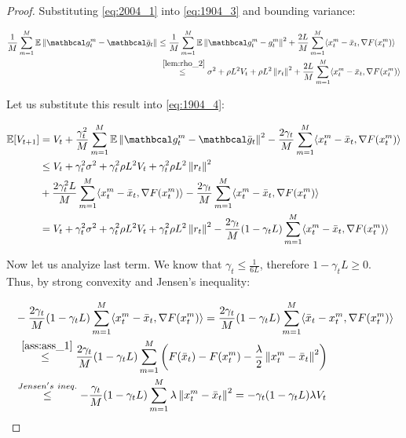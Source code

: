 \begin{proof}
    Substituting \eqref{eq:2004_1} into \eqref{eq:1904_3} and bounding variance:

    \begin{align}
        \fsumm{m=1}{M} \E \norm{\mc{g}^m_t - \mc{\bar{g}}_t} 
        &\leq
        \fsumm{m=1}{M} \E \norm{\mc{g}^m_t - g^m_t}^2 
        +
        \frac{2L}{M} \summ{m=1}{M} \inner{x^m_t - \bar{x}_t}{\nabla F(x^m_t)} \\
        &\overset{~\ref{lem:rho_2}}{\leq}
        \sigma^2 + \rho L^2 V_t + \rho L^2 \norm{r_t}^2
        +
        \frac{2L}{M} \summ{m=1}{M} \inner{x^m_t - \bar{x}_t}{\nabla F(x^m_t)}
    \end{align}

    Let us substitute this result into \eqref{eq:1904_4}:

    \begin{align}
        \E [V_{t+1}] 
        &=
        V_t + \frac{\gamma_{t}^2}{M} \summ{m=1}{M} \E \norm{\mc{g}^m_t - \mc{\bar{g}}_t}^2 - \frac{2\gamma_{t}}{M} \summ{m=1}{M} \inner{x^m_t - \bar{x}_t}{\nabla F(x^m_t)} \\
        &\leq 
        V_t 
        + \gamma_{t}^2 \sigma^2 + \gamma_{t}^2 \rho L^2 V_t + \gamma_{t}^2 \rho L^2 \norm{r_t}^2
        \\
        &+\frac{2 \gamma_{t}^2 L}{M} \summ{m=1}{M} \inner{x^m_t - \bar{x}_t}{\nabla F(x^m_t)}
        - \frac{2\gamma_{t}}{M} \summ{m=1}{M} \inner{x^m_t - \bar{x}_t}{\nabla F(x^m_t)} \\
        &=
        V_t 
        + \gamma_{t}^2 \sigma^2 + \gamma_{t}^2 \rho L^2 V_t + \gamma_{t}^2 \rho L^2 \norm{r_t}^2
        - \frac{2\gamma_{t}}{M}(1 - \gamma_{t} L) \summ{m=1}{M} \inner{x^m_t - \bar{x}_t}{\nabla F(x^m_t)}
        \label{eq:1904_5}
    \end{align}

    Now let us analyize last term. We know that $\gamma_{t} \leq \frac{1}{6L}$, therefore $1 - \gamma_{t} L \geq 0$. Thus, by strong convexity and Jensen's inequality:

    \begin{align}
        &- \frac{2\gamma_{t}}{M}(1 - \gamma_{t} L) \summ{m=1}{M} \inner{x^m_t - \bar{x}_t}{\nabla F(x^m_t)} 
        =
        \frac{2\gamma_{t}}{M}(1 - \gamma_{t} L) \summ{m=1}{M} \inner{\bar{x}_t - x^m_t}{\nabla F(x^m_t)} \\
        &\overset{~\ref{ass:ass_1}}{\leq}
        \frac{2\gamma_{t}}{M}(1 - \gamma_{t} L) \summ{m=1}{M} \left(F(\bar{x}_t) - F(x^m_t) - \frac{\lambda}{2} \norm{x^m_t - \bar{x}_t}^2 \right) \\
        &\overset{Jensen's \ ineq.}{\leq}
        - \frac{\gamma_{t}}{M}(1 - \gamma_{t} L) \summ{m=1}{M} \lambda \norm{x^m_t - \bar{x}_t}^2 
        =
        - \gamma_{t} (1 - \gamma_{t} L) \lambda V_t
        \label{eq:1904_6}
    \end{align}


\end{proof}

